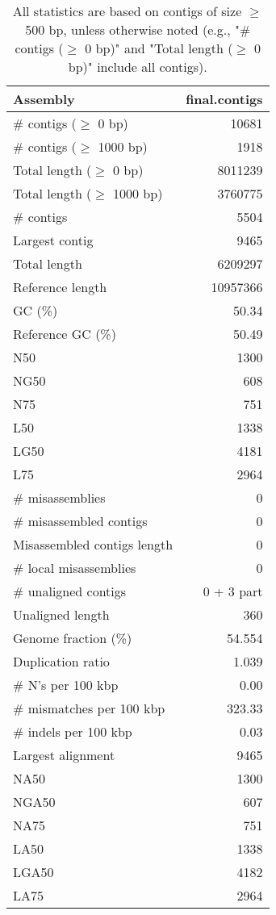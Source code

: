 \documentclass[12pt,a4paper]{article}
\begin{document}
\begin{table}[ht]
\begin{center}
\caption{All statistics are based on contigs of size $\geq$ 500 bp, unless otherwise noted (e.g., "\# contigs ($\geq$ 0 bp)" and "Total length ($\geq$ 0 bp)" include all contigs).}
\begin{tabular}{|l*{1}{|r}|}
\hline
Assembly & final.contigs \\ \hline
\# contigs ($\geq$ 0 bp) & 10681 \\ \hline
\# contigs ($\geq$ 1000 bp) & 1918 \\ \hline
Total length ($\geq$ 0 bp) & 8011239 \\ \hline
Total length ($\geq$ 1000 bp) & 3760775 \\ \hline
\# contigs & 5504 \\ \hline
Largest contig & 9465 \\ \hline
Total length & 6209297 \\ \hline
Reference length & 10957366 \\ \hline
GC (\%) & 50.34 \\ \hline
Reference GC (\%) & 50.49 \\ \hline
N50 & 1300 \\ \hline
NG50 & 608 \\ \hline
N75 & 751 \\ \hline
L50 & 1338 \\ \hline
LG50 & 4181 \\ \hline
L75 & 2964 \\ \hline
\# misassemblies & 0 \\ \hline
\# misassembled contigs & 0 \\ \hline
Misassembled contigs length & 0 \\ \hline
\# local misassemblies & 0 \\ \hline
\# unaligned contigs & 0 + 3 part \\ \hline
Unaligned length & 360 \\ \hline
Genome fraction (\%) & 54.554 \\ \hline
Duplication ratio & 1.039 \\ \hline
\# N's per 100 kbp & 0.00 \\ \hline
\# mismatches per 100 kbp & 323.33 \\ \hline
\# indels per 100 kbp & 0.03 \\ \hline
Largest alignment & 9465 \\ \hline
NA50 & 1300 \\ \hline
NGA50 & 607 \\ \hline
NA75 & 751 \\ \hline
LA50 & 1338 \\ \hline
LGA50 & 4182 \\ \hline
LA75 & 2964 \\ \hline
\end{tabular}
\end{center}
\end{table}
\end{document}
